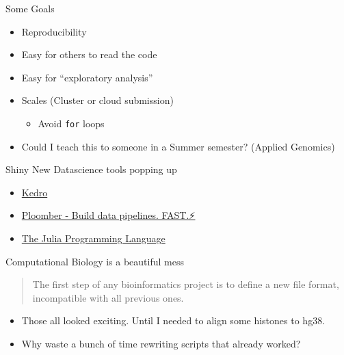 \documentclass[bigger]{beamer}
\begin{document}
\begin{frame}[label={sec:org868e012},fragile]{Some Goals}
 \begin{itemize}
\item Reproducibility
\item Easy for others to read the code
\item Easy for ``exploratory analysis''
\item Scales (Cluster or cloud submission)
\begin{itemize}
\item Avoid \texttt{for} loops
\end{itemize}
\item Could I teach this to someone in a Summer semester? (Applied Genomics)
\end{itemize}
\end{frame}

\begin{frame}[label={sec:orgbb9ae00}]{Shiny New Datascience tools popping up}
\begin{itemize}
\item \href{https://kedro.readthedocs.io/en/stable/}{Kedro}
\item \href{https://ploomber.io/}{Ploomber - Build data pipelines. FAST.⚡️}
\item \href{https://julialang.org/}{The Julia Programming Language}
\end{itemize}
\end{frame}

\begin{frame}[label={sec:orgec52754}]{Computational Biology is a beautiful mess}
\begin{quote}
The first step of any bioinformatics project is to define a new file format,
incompatible with all previous ones.
\end{quote}

\begin{itemize}
\item Those all looked exciting. Until I needed to align some histones to hg38.
\item Why waste a bunch of time rewriting scripts that already worked?
\end{itemize}
\end{frame}
\end{document}
